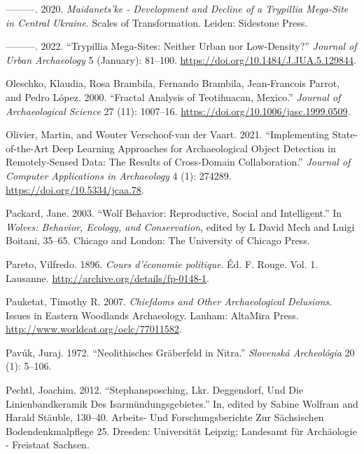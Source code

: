 \documentclass[
  12pt,
  a4paper, twoside]{book}
\newlength{\cslhangindent}
\newlength{\cslentryspacingunit} %
\newenvironment{CSLReferences}[2] %
 {%
  \setlength{\parindent}{0pt}
  \ifodd #1
  \let\oldpar\par
  \def\par{\hangindent=\cslhangindent\oldpar}
  \fi
  \setlength{\parskip}{#2\cslentryspacingunit}
 }%
 {}
\begin{document}
\begin{CSLReferences}{1}{0}
\leavevmode{}%
---------. 2020. \emph{Maidanets'ke - Development and Decline of a Trypillia Mega-Site in Central Ukraine}. Scales of Transformation. Leiden: Sidestone Press.

\leavevmode{}%
---------. 2022. {``Trypillia Mega-Sites: Neither Urban nor Low-Density?''} \emph{Journal of Urban Archaeology} 5 (January): 81--100. \url{https://doi.org/10.1484/J.JUA.5.129844}.

\leavevmode{}%
Oleschko, Klaudia, Rosa Brambila, Fernando Brambila, Jean-Francois Parrot, and Pedro López. 2000. {``Fractal Analysis of Teotihuacan, Mexico.''} \emph{Journal of Archaeological Science} 27 (11): 1007--16. \url{https://doi.org/10.1006/jasc.1999.0509}.

\leavevmode{}%
Olivier, Martin, and Wouter Verschoof-van der Vaart. 2021. {``Implementing State-of-the-Art Deep Learning Approaches for Archaeological Object Detection in Remotely-Sensed Data: The Results of Cross-Domain Collaboration.''} \emph{Journal of Computer Applications in Archaeology} 4 (1): 274289. \url{https://doi.org/10.5334/jcaa.78}.

\leavevmode{}%
Packard, Jane. 2003. {``Wolf Behavior: Reproductive, Social and Intelligent.''} In \emph{Wolves: Behavior, Ecology, and Conservation}, edited by L David Mech and Luigi Boitani, 35--65. {Chicago and London}: {The University of Chicago Press}.

\leavevmode{}%
Pareto, Vilfredo. 1896. \emph{Cours d'économie politique}. Éd. F. Rouge. Vol. 1. Lausanne. \url{http://archive.org/details/fp-0148-1}.

\leavevmode{}%
Pauketat, Timothy R. 2007. \emph{Chiefdoms and Other Archaeological Delusions}. Issues in Eastern Woodlands Archaeology. Lanham: AltaMira Press. \url{http://www.worldcat.org/oclc/77011582}.

\leavevmode{}%
Pavúk, Juraj. 1972. {``Neolithisches Gräberfeld in Nitra.''} \emph{Slovenská Archeológia} 20 (1): 5--106.

\leavevmode{}%
Pechtl, Joachim. 2012. {``Stephansposching, Lkr. Deggendorf, Und Die Linienbandkeramik Des Isarmündungsgebietes.''} In, edited by Sabine Wolfram and Harald Stäuble, 130--40. Arbeits- Und Forschungsberichte Zur Sächsischen Bodendenkmalpflege 25. Dresden: Universität Leipzig; Landesamt für Archäologie - Freistaat Sachsen.


\end{CSLReferences}
\end{document}
